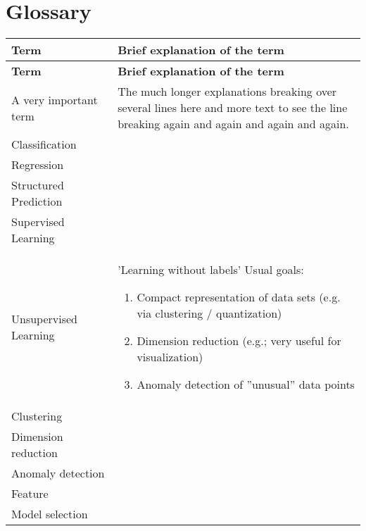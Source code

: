\documentclass[MachineLearning]{subfiles}
\begin{document}
\section{Glossary}
\renewcommand{\arraystretch}{1.5}


\begin{longtable}{p{0.3\linewidth} p{0.7\linewidth}}
\hline \textbf{Term} & \textbf{Brief explanation of the term}\\ \hline
\endfirsthead

\hline \textbf{Term} & \textbf{Brief explanation of the term}\\ \hline\hline
\endhead
A very important term & The much longer explanations breaking over several lines here and more text to see the line breaking again and again and again and again.\\
Classification &  \\

Regression &  \\

Structured Prediction &  \\

Supervised Learning &  \\

Unsupervised Learning & 'Learning without labels' \newline
Usual goals:\newline
\begin{enumerate}
\item Compact representation of data sets (e.g. via clustering / quantization)
\item Dimension reduction (e.g.; very useful for visualization)
\item Anomaly detection of ''unusual'' data points
\end{enumerate} \\

Clustering & \\

Dimension reduction & \\

Anomaly detection & \\

Feature & \\

Model selection & \\


\end{longtable}
\end{document}
